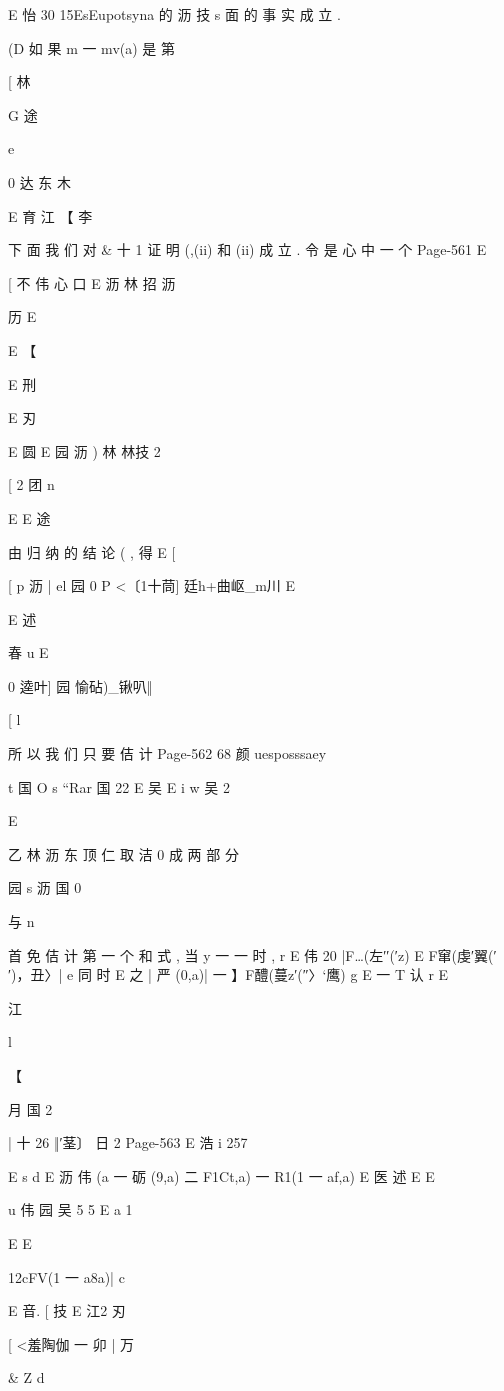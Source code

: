 {{E 怡 30 15EsEupotsyna 的 沥 技 s
面 的 事 实 成 立 .

(D 如 果 m 一 mv(a) 是 第 %

[ 林

G 途

e

0 达 东 木

E 育 江
【 李

下 面 我 们 对 & 十 1 证 明 (,(ii) 和 (ii) 成 立 . 令 是 心 中 一 个
Page-561
E

[
不 伟 心 口
E 沥 林 招 沥

历
E

E 【

E 刑

E 刃

E 圆
E 园 沥 ) 林 林技 2

[ 2
团 n

E E 途

由 归 纳 的 结 论 ( , 得
E
[

[
p 沥
| el 园 0
P <〔1十茼] 廷h+曲岖_m川 E

E 述

春
u
E

0 逵叶] 园 愉砧)_锹叭‖

[ l

所 以 我 们 只 要 佶 计
Page-562
68 颜 uesposssaey

t
国 O
s “Rar
国 22 E 吴
E
i w
吴
2

E

乙 林 沥 东 顶 仁 取 洁 0
成 两 部 分

园 s 沥
国 0

与
n

首 免 佶 计 第 一 个 和 式 , 当 y 一 一 时 , r
E 伟
20 |F…(左′′(′z) E F窜(虔′翼(′′)，丑〉|
e
同 时
E
之 | 严 (0,a)| 一 】F醴(蔓z′(″〉`鹰) g
E 一 T 认
r
E

江

l

【

月
国 2

| 十 26 ‖′茎〕 日 2
Page-563
E 浩 i 257

E
s d
E 沥 伟
(a 一 砺 (9,a) 二 F1Ct,a) 一 R1(1 一 af,a)
E 医 述
E
E

u 伟
园 吴 5 5 E
a 1

E
E

12cFV(1 一 a8a)|
c

E 音. [
技
E 江2 刃

[ <羞陶伽 一 卯 | 万

& Z
d

}}
